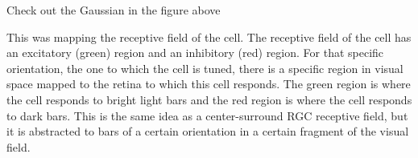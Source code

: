 \documentclass{121Temp}
\begin{document}
\hwproblem
Check out the Gaussian in the figure above

\hwproblem
This was mapping the receptive field of the cell. The receptive field of the cell has an excitatory (green) region and an inhibitory (red) region. For that specific orientation, the one to which the cell is tuned, there is a specific region in visual space mapped to the retina to which this cell responds. The green region is where the cell responds to bright light bars and the red region is where the cell responds to dark bars. This is the same idea as a center-surround RGC receptive field, but it is abstracted to bars of a certain orientation in a certain fragment of the visual field. 
\end{document}
